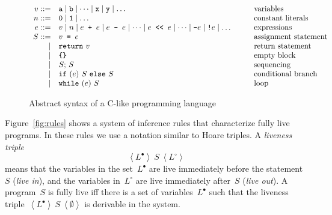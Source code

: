 \documentclass{llncs}
\newcommand{\liveout}[1]{\ensuremath{#1^{\circ}}}
\newcommand{\livein}[1]{\ensuremath{#1^{\bullet}}}
\newcommand{\triple}[3]{\ensuremath{
    \left\langle#1\right\rangle \ #2 \ \left\langle#3\right\rangle
}}
\begin{document}
\begin{figure}
\[
\begin{array}{rll}
v ::= &
    \mathtt{a} \mid \mathtt{b} \mid \dots \mid \mathtt{x} \mid \mathtt{y}
    \mid \dots &
    \mbox{variables} \\
n ::= & \mathtt{0} \mid \mathtt{1} \mid \dots & \mbox{constant literals} \\
e ::= &
    v \mid
    n \mid
    e \mbox{\texttt{ + }} e \mid e \mbox{\texttt{ - }} e \mid \dots
    \mid e \mbox{\texttt{ <{}< }} e \mid \dots \mid \mbox{\texttt{-}} e \mid
    \mbox{\texttt{!}} e
    \mid \dots \qquad &
    \mbox{expressions} \\
S ::=
    & v \mbox{\texttt{\ =\ }} e & \mbox{assignment statement} \\
\mid & \mathtt{return\ } v & \mbox{return statement} \\
\mid & \mbox{\texttt{\{\}}} & \mbox{empty block} \\ 
\mid & S \mathtt{;\ } S & \mbox{sequencing} \\
\mid & \mathtt{if\ (}e\mathtt{)\ } S \mathtt{\ else\ } S & \mbox{conditional branch} \\
\mid & \mathtt{while\ (}e\mathtt{)\ } S & \mbox{loop}
\end{array}
\]
\caption{Abstract syntax of a C-like programming language}
\label{fig:syntax}
\end{figure}

Figure~\ref{fig:rules} shows a system of inference rules that characterize
fully live programs. In these rules we use a notation similar to Hoare
triples. A \emph{liveness triple} \[\triple{\livein{L}}{S}{\liveout{L}}\]
means that the variables in the set~\(\livein{L}\) are live immediately
before the statement~\(S\) (\emph{live in}), and the variables
in~\(\liveout{L}\) are live immediately after~\(S\) (\emph{live out}). A
program~\(S\) is fully live iff there is a set of variables~\(\livein{L}\)
such that the liveness triple~\(\triple{\livein{L}}{S}{\emptyset}\) is
derivable in the system.
\end{document}
